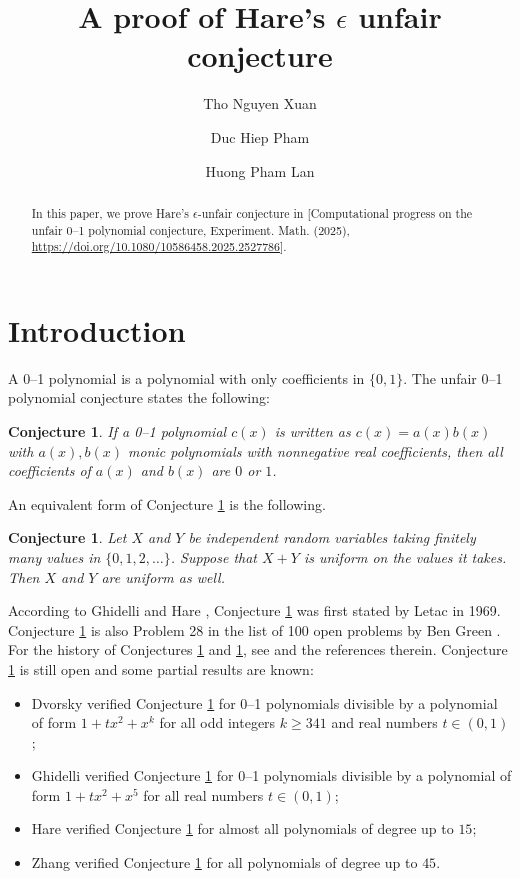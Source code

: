 \documentclass[a4paper,12pt,english,reqno]{amsart}
\title{A proof of Hare's $\epsilon$ unfair conjecture}
\author[1]{Tho Nguyen Xuan}
\author[2]{Duc Hiep Pham}
\author{Huong Pham Lan}
\date{}
\newtheorem{conj}[thm]{Conjecture}
\theoremstyle{definition}
\theoremstyle{remark}
\begin{document}
     \begin{abstract} In this paper, we  prove Hare's $\epsilon$-unfair conjecture in
[Computational progress on the unfair 0--1 polynomial conjecture, 
Experiment. Math. (2025), \url{https://doi.org/10.1080/10586458.2025.2527786}].
     \end{abstract}
     \maketitle
     \section{Introduction}
   A 0--1 polynomial is a polynomial with only coefficients in $\{0,1\}$. The unfair 0--1 polynomial conjecture states the following:
   \begin{conj}\label{C1} If a 0--1 polynomial $c(x)$ is written as $c(x)=a(x)b(x)$ with $a(x),b(x)$ monic polynomials with nonnegative real coefficients, then all coefficients of $a(x)$ and $b(x)$ are $0$ or $1$.
   \end{conj}
   An equivalent form of Conjecture \ref{C1} is the following.
   \begin{conj}\label{C2}
Let $X$ and $Y$ be independent random variables taking finitely many values in $\{0,1,2,\ldots\}$. Suppose that $X+Y$ is uniform on the values it takes. Then $X$ and $Y$ are uniform as well.
   \end{conj}
According to Ghidelli \cite{Ghidelli} and Hare \cite{Hare},   Conjecture \ref{C2} was first stated by Letac in 1969. Conjecture \ref{C2} is also Problem 28  in the list of 100 open problems by Ben Green \cite{Green}. For the history  of Conjectures \ref{C1} and \ref{C2}, see \cite{Ghidelli} and the references therein. Conjecture \ref{C1} is still open and some partial results are known:
\begin{itemize}
\item 
Dvorsky \cite{Dvorsky} verified Conjecture \ref{C1} for 0--1 polynomials divisible by a polynomial of form $1+tx^{2}+x^{k}$ for all odd integers
$k\ge 341$ and real numbers $t\in (0,1)$;
\item Ghidelli \cite{Ghidelli} verified Conjecture \ref{C1} for 0--1 polynomials divisible by a polynomial of form $1+tx^{2}+x^{5}$ for all real numbers $t\in (0,1)$;
\item  Hare \cite{Hare} verified Conjecture \ref{C1} for almost all polynomials of degree up to $15$;
\item Zhang \cite{Zhang} verified Conjecture \ref{C1}  for all polynomials of degree up to $45$. \end{itemize}
\end{document}
